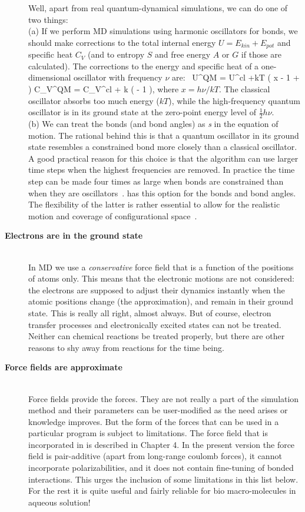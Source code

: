 \begin{description}
Well, apart from real quantum-dynamical simulations, we can do one
of two things: \\ (a) If we perform MD simulations using harmonic
oscillators for bonds, we should make corrections to the total
internal energy $U = E_{kin} + E_{pot}$ and specific heat $C_V$ (and
to entropy $S$ and free energy $A$ or $G$ if those are
calculated). The corrections to the energy and specific heat of a
one-dimensional oscillator with frequency $\nu$
are:~\cite{McQuarrie76}
\beq
 U^{QM} = U^{cl} +kT \left( \half x - 1 +  \right)
\eeq
\beq
 C_V^{QM} = C_V^{cl} + k \left(  - 1 \right), 
\eeq
where $x=h\nu /kT$. The classical oscillator absorbs too much energy
($kT$), while the high-frequency quantum oscillator is in its ground
state at the zero-point energy level of $\frac{1}{2} h\nu$. \\ (b) We
can treat the bonds (and bond angles) as {\em {}s}
in the equation of motion. The rational behind this is that a quantum
oscillator in its ground state resembles a constrained bond more
closely than a classical oscillator. A good practical reason for this
choice is that the algorithm can use larger time steps when the
highest frequencies are removed. In practice the time step can be made
four times as large when bonds are constrained than when they are
oscillators~\cite{Gunsteren77}. {\gromacs} has this option for the
bonds and bond angles.  The flexibility of the latter is
rather essential to allow for the realistic motion and coverage of
configurational space~\cite{Gunsteren77}.

\item[{\bf Electrons are in the ground state}]\mbox{}\\
In MD we use a {\em conservative} force field that is a
function of the positions of atoms only.  This means that the
electronic motions are not considered: the electrons are supposed to
adjust their dynamics instantly when the atomic positions change
(the {\em {}} approximation), and remain in
their ground state. This is really all right, almost always. But of
course, electron transfer processes and electronically excited states
can not be treated. Neither can chemical reactions be treated
properly, but there are other reasons to shy away from reactions for
the time being.

\item[{\bf Force fields are approximate}]\mbox{}\\
Force fields  provide the forces.
They are not really a part of the
simulation method and their parameters can be user-modified as the
need arises or knowledge improves. But the form of the forces that can
be used in a particular program is subject to limitations. The force
field that is incorporated in {\gromacs} is described in Chapter 4. In
the present version the force field is pair-additive (apart from
long-range coulomb forces), it cannot incorporate
polarizabilities, and it does not contain fine-tuning of bonded
interactions. This urges the inclusion of some limitations in this
list below.  For the rest it is quite useful and fairly reliable for
bio macro-molecules in aqueous solution!


\end{description}
